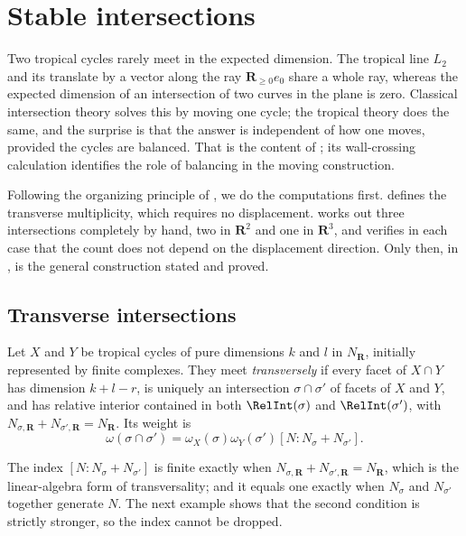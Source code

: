 \section{Stable intersections}
\label{sec:ch10-stable-intersection}

Two tropical cycles rarely meet in the expected dimension.  The tropical line
$L_2$ and its translate by a vector along the ray $\mathbf R_{\geq0}e_0$
share a whole ray, whereas the expected dimension of an intersection of two
curves in the plane is zero.  Classical intersection theory solves this by
moving one cycle; the tropical theory does the same, and the surprise is that
the answer is independent of how one moves, provided the cycles are balanced.
That is the content of ; its
wall-crossing calculation identifies the role of balancing in the moving
construction.

Following the organizing principle of , we do the computations
first.   defines the transverse multiplicity, which
requires no displacement.   works out three
intersections completely by hand, two in $\mathbf R^2$ and one in
$\mathbf R^3$, and verifies in each case that the count does not depend on
the displacement direction.  Only then, in
, is the general construction stated and
proved.

\subsection{Transverse intersections}
\label{sec:ch10-transverse}

Let $X$ and $Y$ be tropical cycles of pure dimensions $k$ and $l$ in
$N_{\mathbf R}$, initially represented by finite complexes.  They meet
\emph{transversely} if every facet of $X\cap Y$ has dimension
$k+l-r$, is uniquely an intersection $\sigma\cap\sigma'$ of facets of
$X$ and $Y$, and has relative interior contained in both
$\RelInt(\sigma)$ and $\RelInt(\sigma')$, with
$N_{\sigma,\mathbf R}+N_{\sigma',\mathbf R}=N_{\mathbf R}$. Its weight is
\[
 \omega(\sigma\cap\sigma')
 =\omega_X(\sigma)\omega_Y(\sigma')
   [N:N_\sigma+N_{\sigma'}].
\]

The index $[N:N_\sigma+N_{\sigma'}]$ is finite exactly when
$N_{\sigma,\mathbf R}+N_{\sigma',\mathbf R}=N_{\mathbf R}$, which is the
linear-algebra form of transversality; and it equals one exactly when
$N_\sigma$ and $N_{\sigma'}$ together generate $N$.  The next example shows
that the second condition is strictly stronger, so the index cannot be
dropped.

